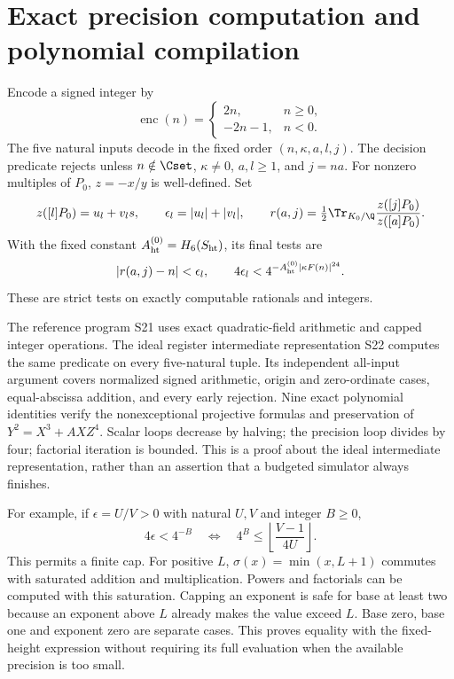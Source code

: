 \section{Exact precision computation and polynomial compilation}\label{sec:compiler}
Encode a signed integer by
\[
 \operatorname{enc}(n)=\begin{cases}2n,&n\ge0,\\-2n-1,&n<0.\end{cases}
\]
The five natural inputs decode in the fixed order $(n,\kappa,a,l,j)$.
The decision predicate rejects unless
$n\notin\Cset$, $\kappa\ne0$, $a,l\ge1$, and $j=na$.
For nonzero multiples of $P_0$, $z=-x/y$ is well-defined. Set
\[
 z([l]P_0)=u_l+v_ls,\qquad\epsilon_l=|u_l|+|v_l|,
 \qquad r(a,j)=\tfrac12\Tr_{K_0/\Q}\frac{z([j]P_0)}{z([a]P_0)}.
\]
With the fixed constant $A_{\rm ht}^{(0)}=H_6(S_{\rm ht})$, its final
tests are
\[
 |r(a,j)-n|<\epsilon_l,\qquad
 4\epsilon_l<4^{-A_{\rm ht}^{(0)}|\kappa F(n)|^{24}}.
\]
These are strict tests on exactly computable rationals and integers.

The reference program S21 uses exact quadratic-field arithmetic and capped
integer operations. The ideal register intermediate representation S22
computes the same predicate on every five-natural tuple. Its independent
all-input argument covers normalized signed arithmetic, origin and
zero-ordinate cases, equal-abscissa addition, and every early rejection.
Nine exact polynomial identities verify the nonexceptional projective
formulas and preservation of $Y^2=X^3+AXZ^4$. Scalar loops decrease by
halving; the precision loop divides by four; factorial iteration is bounded.
This is a proof about the ideal intermediate representation, rather than
an assertion that a budgeted simulator always finishes.

For example, if $\epsilon=U/V>0$ with natural $U,V$ and integer $B\ge0$,
\[
 4\epsilon<4^{-B}\quad\Longleftrightarrow\quad
 4^B\le\left\lfloor\frac{V-1}{4U}\right\rfloor.
\]
This permits a finite cap. For positive $L$, $\sigma(x)=\min(x,L+1)$
commutes with saturated addition and multiplication. Powers and factorials
can be computed with this saturation. Capping an exponent is safe for
base at least two because an exponent above $L$ already makes the value
exceed $L$. Base zero, base one and exponent zero are separate cases.
This proves equality with the fixed-height expression without requiring
its full evaluation when the available precision is too small.

